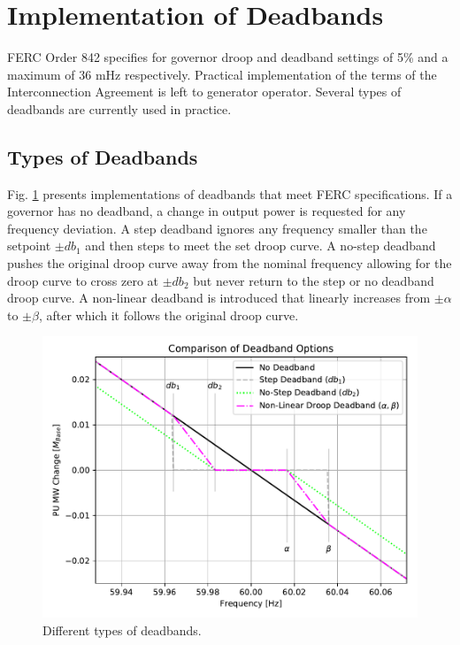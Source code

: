 \section{Implementation of Deadbands}
FERC Order 842 specifies for governor droop and deadband settings of 5\% and a maximum of 36 mHz respectively\cite{ferc2018}.
Practical implementation of the terms of the Interconnection Agreement is left to generator operator. Several types of deadbands are currently used in practice.

\subsection{Types of Deadbands}
Fig. \ref{fig: deadbandType} presents implementations of deadbands that meet FERC specifications.
If a governor has no deadband, a change in output power is requested for any frequency deviation.
A step deadband ignores any frequency smaller than the setpoint $\pm db_1$ and then steps to meet the set droop curve.
A no-step deadband pushes the original droop curve away from the nominal frequency allowing for the droop curve to cross zero at $\pm db_2$ but never return to the step or no deadband droop curve.
A non-linear deadband is introduced that linearly increases from $\pm \alpha$ to $\pm \beta$, after which it follows the original droop curve.

\begin{figure}[!ht]
	\centering
	\includegraphics[width=\linewidth]{figures/dbAction3}
	\caption{Different types of deadbands.}
	\label{fig: deadbandType}
\end{figure}